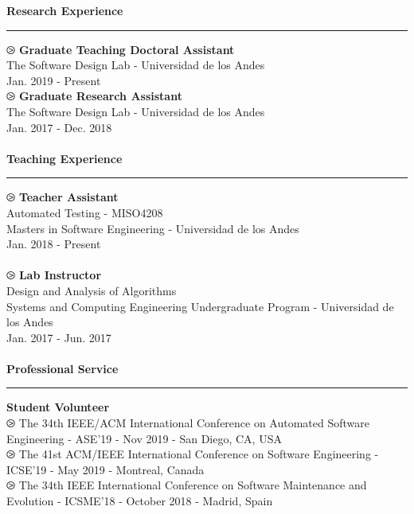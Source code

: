 \documentclass[letterpaper,11pt,oneside]{article}
\begin{document}
\noindent \Large{\textbf{Research Experience}} \\
\vspace{-2ex}
\hrule 
\normalsize
\vspace{2ex}
\noindent $\ogreaterthan$ \textbf{Graduate Teaching Doctoral Assistant} \\
	The Software Design Lab - Universidad de los Andes \\
	Jan. 2019 - Present\\
\noindent $\ogreaterthan$ \textbf{Graduate Research Assistant} \\
The Software Design Lab - Universidad de los Andes \\
Jan. 2017 - Dec. 2018\\
\\
\noindent \Large{\textbf{Teaching Experience}} \\
\vspace{-2ex}
\hrule 
\normalsize
\vspace{2ex}
\noindent $\ogreaterthan$ \textbf{Teacher Assistant} \\
Automated Testing - MISO4208 \\
Masters in Software Engineering - Universidad de los Andes \\
Jan. 2018 - Present\\
\\
\noindent $\ogreaterthan$ \textbf{Lab Instructor} \\
Design and Analysis of Algorithms \\
Systems and Computing Engineering Undergraduate Program - Universidad de los Andes \\
Jan. 2017 - Jun. 2017\\
\\
\noindent \Large{\textbf{Professional Service}} \\
\vspace{-2ex}
\hrule 
\normalsize
\vspace{2ex}
\noindent \textbf{Student Volunteer} \\
$\ogreaterthan$ The 34th IEEE/ACM International Conference on Automated Software Engineering - ASE'19 - Nov 2019 - San Diego, CA, USA \\
$\ogreaterthan$ The 41st ACM/IEEE International Conference on Software Engineering - ICSE'19 - May 2019 - Montreal, Canada \\
$\ogreaterthan$ The 34th IEEE International Conference on Software Maintenance and Evolution - ICSME'18 - October 2018 - Madrid, Spain \\
\end{document}
